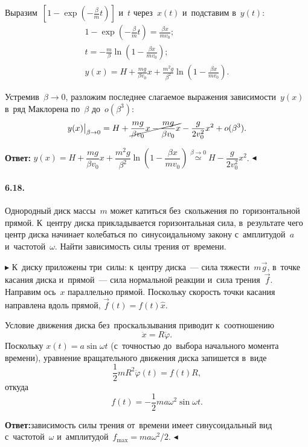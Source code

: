 \documentclass{weekly}
\begin{document}
Выразим~$\left[ 1 - \exp\left( -\frac{\beta}{m} t \right) \right]$
и~$t$ через~$x(t)$ и~подставим в~$y(t)$:
\begin{gather}
    1 - \exp\left( -\frac{\beta}{m} t \right)
        = \frac{\beta x}{m v_0}; \\
    t = -\frac{m}{\beta} \ln\left(1 - \frac{\beta x}{m v_0}\right); \\
    y(x) = H + \frac{mg}{\beta v_0} x +
            \frac{m^2 g}{\beta^2}
            \ln\left( 1 - \frac{\beta x}{m v_0}\right).
\end{gather}

Устремив~$\beta \to 0$, разложим последнее слагаемое
выражения зависимости~$y(x)$ в~ряд Маклорена по~$\beta$ до~$o(\beta^3)$:
\begin{equation}
    y(x)\big|_{\beta \to 0} = H + \cancel{\frac{mg}{\beta v_0} x -
            \frac{mg}{\beta v_0}x} - \frac{g}{2v_0^2}x^2 + o(\beta^3).
\end{equation}

\textbf{Ответ:}\quad
$y(x) = H + \dfrac{mg}{\beta v_0} x + \dfrac{m^2 g}{\beta^2}
\ln\left( 1 - \dfrac{\beta x}{m v_0}\right)
\stackrel{\beta \to 0}{\simeq} H - \dfrac{g}{2v_0^2}x^2$.
\hfill $\blacktriangleleft$


\paragraph{6.18.} Однородный диск массы~$m$ может катиться без~скольжения
по~горизонтальной прямой. К~центру диска прикладывается горизонтальная
сила, в~результате чего центр диска начинает колебаться
по~синусоидальному закону с~амплитудой~$a$ и~частотой~$\omega$.
Найти зависимость силы трения от~времени.

$\blacktriangleright$ К~диску приложены три~силы:
к~центру диска~--- сила тяжести~$m\vec g$,
в~точке касания диска и~прямой~--- сила нормальной реакции
и~сила трения~$\vec f$.
Направим ось~$x$ параллельно прямой. Поскольку скорость точки касания
направлена вдоль прямой, $\vec f(t) = f(t) \hat x$.

Условие движения диска без~проскальзывания приводит к~соотношению
\begin{equation}
    \ddot x = R \ddot\varphi.
\end{equation}
Поскольку $x(t) = a\sin\omega t$ (с~точностью до~выбора начального
момента времени), уравнение вращательного движения диска запишется в~виде
\begin{equation}
    \frac12 mR^2 \ddot\varphi(t) = f(t) R,
\end{equation}
откуда
\begin{equation}
    f(t) = -\frac12 ma\omega^2 \sin\omega t.
\end{equation}

\textbf{Ответ:}\quad зависимость силы трения от~времени
имеет синусоидальный вид с~частотой~$\omega$
и~амплитудой~$f_{\max} = ma\omega^2/2$.
\hfill $\blacktriangleleft$
\end{document}
